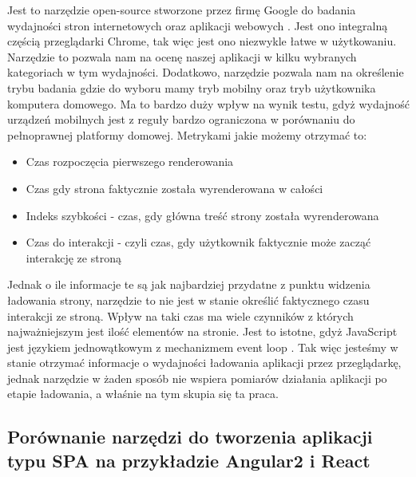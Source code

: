 Jest to narzędzie open-source stworzone przez firmę Google do badania wydajności stron internetowych oraz aplikacji webowych \cite{lighthouse}. Jest ono integralną częścią przeglądarki Chrome, tak więc jest ono niezwykle łatwe w użytkowaniu. Narzędzie to pozwala nam na ocenę naszej aplikacji w kilku wybranych kategoriach w tym wydajności. Dodatkowo, narzędzie pozwala nam na określenie trybu badania gdzie do wyboru mamy tryb mobilny oraz tryb użytkownika komputera domowego. Ma to bardzo duży wpływ na wynik testu, gdyż wydajność urządzeń mobilnych jest z reguły bardzo ograniczona w porównaniu do pełnoprawnej platformy domowej. Metrykami jakie możemy otrzymać to:
\begin{itemize}
	\item Czas rozpoczęcia pierwszego renderowania
	\item Czas gdy strona faktycznie została wyrenderowana w całości
	\item Indeks szybkości - czas, gdy główna treść strony została wyrenderowana
	\item Czas do interakcji - czyli czas, gdy użytkownik faktycznie może zacząć interakcję ze stroną
\end{itemize}

Jednak o ile informacje te są jak najbardziej przydatne z punktu widzenia ładowania strony,
narzędzie to nie jest w stanie określić faktycznego czasu interakcji ze stroną.
Wpływ na taki czas ma wiele czynników z których najważniejszym jest ilość elementów na stronie.
Jest to istotne, gdyż JavaScript jest językiem jednowątkowym z mechanizmem event loop \cite{you-dont-know-js}.
Tak więc jesteśmy w stanie otrzymać informacje o wydajności ładowania aplikacji przez przeglądarkę,
jednak narzędzie w żaden sposób nie wspiera pomiarów działania aplikacji po etapie ładowania, a właśnie na tym skupia się ta praca.

\subsection{Porównanie narzędzi do tworzenia aplikacji typu SPA na przykładzie Angular2 i React}
